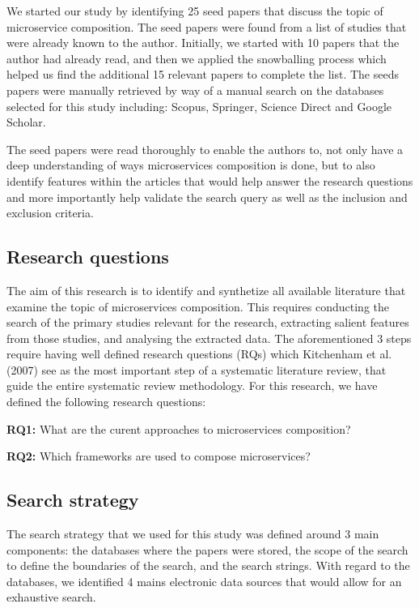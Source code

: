\documentclass{article}
\begin{document}
\begin{multicols}{2}
We started our study by identifying 25 seed papers that discuss the topic of microservice composition. The seed papers were found from a list of studies that were already known to the author. Initially, we started with 10 papers that the author had already read, and then we applied the snowballing process which helped us find the additional 15 relevant papers to complete the list. The seeds papers were manually retrieved by way of a manual search on the databases selected for this study including: Scopus, Springer, Science Direct and Google Scholar.

The seed papers were read thoroughly to enable the authors to, not only have a deep understanding of ways microservices composition is done, but to also identify features within the articles that would help answer the research questions and more importantly help validate the search query as well as the inclusion and exclusion criteria. 

\subsection{Research questions}

The aim of this research is to identify and synthetize all available literature that examine the topic of microservices composition. This requires conducting the search of the primary studies relevant for the research, extracting salient features from those studies, and analysing the extracted data. The aforementioned 3 steps require having well defined research questions (RQs) which Kitchenham et al. (2007) see as the most important step of a systematic literature review, that guide the entire systematic review methodology. For this research, we have defined the following research questions:

\textbf{RQ1:} What are the curent approaches to microservices composition?

\textbf{RQ2:} Which frameworks are used to compose microservices?


\subsection{Search strategy}

The search strategy that we used for this study was defined around 3 main components: the databases where the papers were stored, the scope of the search to define the boundaries of the search, and the search strings.
With regard to the databases, we identified 4 mains electronic data sources that would allow for an exhaustive search.


\end{multicols}
\end{document}
